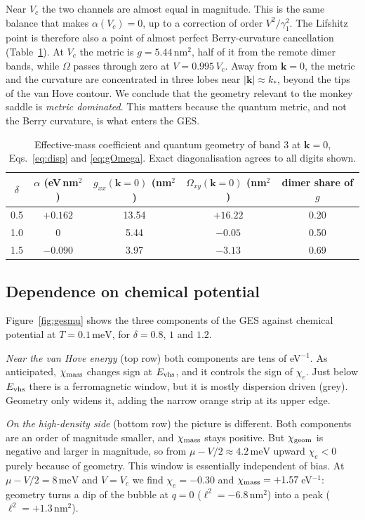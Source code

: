 \documentclass[12pt,a4paper]{article}
\newcommand{\bk}{\mathbf{k}}
\newcommand{\chie}{\chi_{e}}
\newcommand{\chig}{\chi_{\rm geom}}
\newcommand{\chim}{\chi_{\rm mass}}
\newcommand{\Evhs}{E_{\rm vhs}}
\newcommand{\meV}{\,\mathrm{meV}}
\newcommand{\nm}{\,\mathrm{nm}}
\begin{document}
Near $V_c$ the two channels are almost equal in magnitude. This is the same balance that makes $\alpha(V_c)=0$, up to a correction of order $V^2/\gamma_1^2$. The Lifshitz point is therefore also a point of almost perfect Berry-curvature cancellation (Table~\ref{tab:geo}). At $V_c$ the metric is $g=5.44\nm^2$, half of it from the remote dimer bands, while $\Omega$ passes through zero at $V=0.995\,V_c$. Away from $\bk=0$, the metric and the curvature are concentrated in three lobes near $|\bk|\approx k_*$, beyond the tips of the van Hove contour. We conclude that the geometry relevant to the monkey saddle is \emph{metric dominated}. This matters because the quantum metric, and not the Berry curvature, is what enters the GES.

\begin{table}[t]
\centering
\caption{Effective-mass coefficient and quantum geometry of band 3 at $\bk=0$, Eqs.~\eqref{eq:disp} and \eqref{eq:gOmega}. Exact diagonalisation agrees to all digits shown.}
\label{tab:geo}
\small
\begin{tabular}{ccccc}
\toprule
$\delta$ & $\alpha$ (eV\,nm$^2$) & $g_{xx}(\bk=0)$ (nm$^2$) & $\Omega_{xy}(\bk=0)$ (nm$^2$) & dimer share of $g$\\
\midrule
0.5 & $+0.162$ & 13.54 & $+16.22$ & 0.20\\
1.0 & $0$ & 5.44 & $-0.05$ & 0.50\\
1.5 & $-0.090$ & 3.97 & $-3.13$ & 0.69\\
\bottomrule
\end{tabular}
\end{table}

\subsection{Dependence on chemical potential}\label{sec:mu}

Figure~\ref{fig:gesmu} shows the three components of the GES against chemical potential at $T=0.1\meV$, for $\delta=0.8$, $1$ and $1.2$.

\emph{Near the van Hove energy} (top row) both components are tens of eV$^{-1}$. As anticipated, $\chim$ changes sign at $\Evhs$, and it controls the sign of $\chie$. Just below $\Evhs$ there is a ferromagnetic window, but it is mostly dispersion driven (grey). Geometry only widens it, adding the narrow orange strip at its upper edge.

\emph{On the high-density side} (bottom row) the picture is different. Both components are an order of magnitude smaller, and $\chim$ stays positive. But $\chig$ is negative and larger in magnitude, so from $\mu-V/2\approx4.2\meV$ upward $\chie<0$ purely because of geometry. This window is essentially independent of bias. At $\mu-V/2=8\meV$ and $V=V_c$ we find $\chie=-0.30$ and $\chim=+1.57\,$eV$^{-1}$: geometry turns a dip of the bubble at $q=0$ ($\ell^2=-6.8\nm^2$) into a peak ($\ell^2=+1.3\nm^2$).
\end{document}

